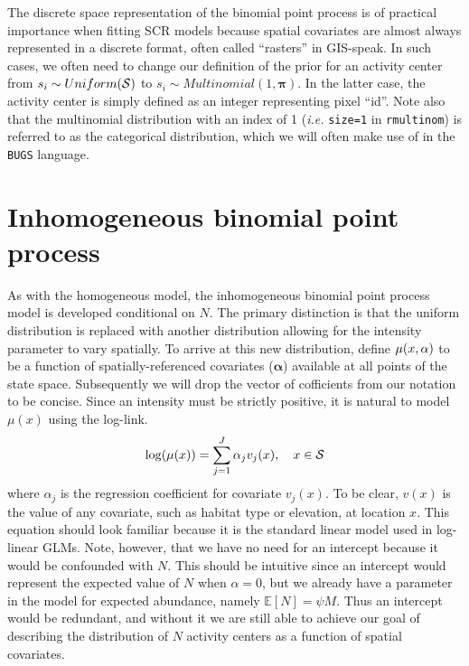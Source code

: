 The discrete space representation of the binomial point process is of
practical importance when fitting SCR models because spatial covariates
are almost always represented in a discrete format, often called
``rasters'' in GIS-speak. In such cases, we often need to change our
definition of the prior for an activity center from $s_i \sim
Uniform(\cal{S})$ to $s_i \sim Multinomial(1, \mathbf{\pi})$. In the
latter case, the activity center is simply defined as an integer
representing pixel ``id''. Note also that the multinomial distribution
with an index of 1 (\emph{i.e.} \verb+size=1+ in \verb+rmultinom+) 
is referred to as the categorical distribution,  
which we will often make use of in the \verb+BUGS+ language.



\section{Inhomogeneous binomial point process}

As with the homogeneous model, the inhomogeneous binomial point process
model is developed conditional on $N$. The primary distinction is that
the uniform distribution is replaced with another distribution
allowing for the intensity parameter to vary spatially. To arrive at
this new distribution, define $\mu(x, {\bf \alpha})$ to be a function of
spatially-referenced covariates ($\mathbf{\alpha}$) available at all points of the state
space.  Subsequently we will drop the vector of cofficients from our
notation to be concise. Since an intensity must be strictly
positive, it is natural to model $\mu(x)$ using the log-link.
\[
\log(\mu(x)) = \sum_{j=1}^J \alpha_j v_j(x), \quad  x \in \cal{S}
\]
where $\alpha_j$ is the regression coefficient for covariate
$v_j(x)$. To be clear, $v(x)$ is the value of any covariate, such as
habitat type or elevation, at location $x$.  This equation should look
familiar because it is the standard linear model used in log-linear
GLMs. Note, however, that we have no need
for an intercept because it would be confounded with
$N$. This should be intuitive since an intercept would
represent the expected value of $N$ when $\alpha=0$, but we already
have a parameter in the model for expected abundance, namely $\mathbb{E}[N] =
\psi M$. Thus an intercept would be
redundant, and without it we are still able to achieve our goal of
describing the distribution of $N$ activity centers as a function of
spatial covariates.

